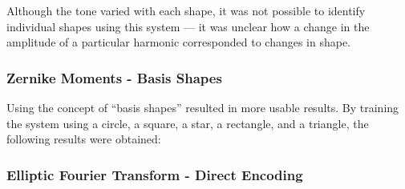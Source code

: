 Although the tone varied with each shape, it was not possible to identify individual shapes using this system --- it was unclear how a change in the amplitude of a particular harmonic corresponded to changes in shape.

\subsubsection{Zernike Moments - Basis Shapes}
Using the concept of ``basis shapes'' resulted in more usable results. By training the system using a circle, a square, a star, a rectangle, and a triangle, the following results were obtained:

\subsubsection{Elliptic Fourier Transform - Direct Encoding}

